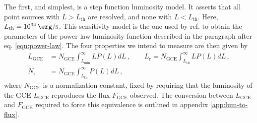 \documentclass[a4paper,11pt]{article}
\begin{document}
The first, and simplest, is a step function luminosity model. It asserts that all point sources with $L>L_\text{th}$ are resolved, and none with $L<L_{\text{th}}$. Here, $L_\text{th} = \SI{e34}{\erg\per\second}$. This sensitivity model is the one used by ref. \cite{Zhong:2019ycb} to obtain the parameters of the power law luminosity function described in the paragraph after eq. \ref{eqn:power-law}. The four properties we intend to measure are then given by
\begin{equation}
    \begin{split}
        L_\text{GCE} &= N_\text{GCE}\int_{L_\text{min}}^\infty L P(L) dL \,, \qquad
        L_\text{r} = N_\text{GCE}\int_{L_\text{th}}^\infty L P(L) dL \,, \\
        N_\text{r} &= N_\text{GCE}\int_{L_\text{th}}^\infty P(L) dL \,,
        \label{eqn:observables-sens-1}
    \end{split}
\end{equation}
where $N_\text{GCE}$ is a normalization constant, fixed by requiring that the luminosity of the GCE $L_\text{GCE}$ reproduces the flux $F_\text{GCE}$ observed. The conversion between $L_\text{GCE}$ and $F_\text{GCE}$ required to force this equivalence is outlined in appendix \ref{app:lum-to-flux}.
\end{document}
